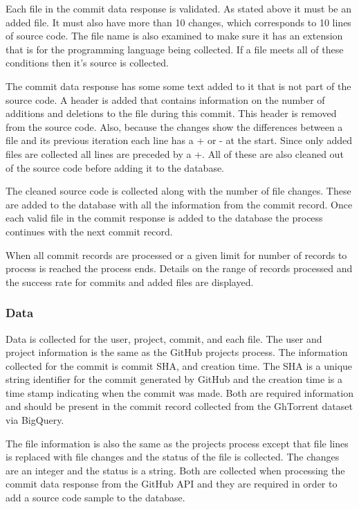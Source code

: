 \documentclass{article}
\begin{document}
Each file in the commit data response is validated. As stated above it must be an added file. It must also have more than 10 changes, which corresponds to 10 lines of source code. The file name is also examined to make sure it has an extension that is for the programming language being collected. If a file meets all of these conditions then it's source is collected.

The commit data response has some some text added to it that is not part of the source code. A header is added that contains information on the number of additions and deletions to the file during this commit. This header is removed from the source code. Also, because the changes show the differences between a file and its previous iteration each line has a + or - at the start. Since only added files are collected all lines are preceded by a +. All of these are also cleaned out of the source code before adding it to the database.

The cleaned source code is collected along with the number of file changes. These are added to the database with all the information from the commit record.
Once each valid file in the commit response is added to the database the process continues with the next commit record.

When all commit records are processed or a given limit for number of records to process is reached the process ends. Details on the range of records processed and the success rate for commits and added files are displayed.

\subsubsection*{Data}
Data is collected for the user, project, commit, and each file. The user and project information is the same as the GitHub projects process. The information collected for the commit is commit SHA, and creation time. The SHA is a unique string identifier for the commit generated by GitHub and the creation time is a time stamp indicating when the commit was made. Both are required information and should be present in the commit record collected from the GhTorrent dataset via BigQuery.

The file information is also the same as the projects process except that file lines is replaced with file changes and the status of the file is collected. The changes are an integer and the status is a string. Both are collected when processing the commit data response from the GitHub API and they are required in order to add a source code sample to the database.
\end{document}

